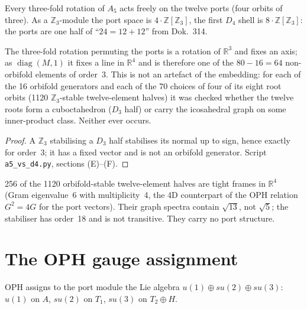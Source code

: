 \begin{theorem}
Every three-fold rotation of $A_5$ acts freely on the twelve ports (four
orbits of three). As a $\mathbb{Z}_3$-module the port space is
$4\cdot\mathbb{Z}[\mathbb{Z}_3]$, the first $D_4$ shell is
$8\cdot\mathbb{Z}[\mathbb{Z}_3]$: the ports are one half of
\enquote{$24=12+12$} from Dok.~314.
\end{theorem}

\begin{theorem}\label{thm:neg}
The three-fold rotation permuting the ports is a rotation of $\mathbb{R}^3$
and fixes an axis; as $\operatorname{diag}(M,1)$ it fixes a line in
$\mathbb{R}^4$ and is therefore one of the $80-16=64$ non-orbifold elements
of order~3. This is not an artefact of the embedding: for each of the 16
orbifold generators and each of the 70 choices of four of its eight root
orbits (1120 $\mathbb{Z}_3$-stable twelve-element halves) it was checked
whether the twelve roots form a cuboctahedron ($D_3$ half) or carry the
icosahedral graph on some inner-product class. Neither ever occurs.
\end{theorem}

\begin{proof}
A $\mathbb{Z}_3$ stabilising a $D_3$ half stabilises its normal up to sign,
hence exactly for order~3; it has a fixed vector and is not an orbifold
generator. Script \texttt{a5\_vs\_d4.py}, sections (E)--(F).
\end{proof}

\begin{remark}
256 of the 1120 orbifold-stable twelve-element halves are tight frames in
$\mathbb{R}^4$ (Gram eigenvalue~6 with multiplicity~4, the 4D counterpart
of the OPH relation $G^2=4G$ for the port vectors). Their graph spectra
contain $\sqrt{13}$, not $\sqrt5$; the stabiliser has order~18 and is not
transitive. They carry no port structure.
\end{remark}

\section{The OPH gauge assignment}

OPH assigns to the port module the Lie algebra $u(1)\oplus su(2)\oplus su(3)$:
$u(1)$ on $A$, $su(2)$ on $T_1$, $su(3)$ on $T_2\oplus H$.

